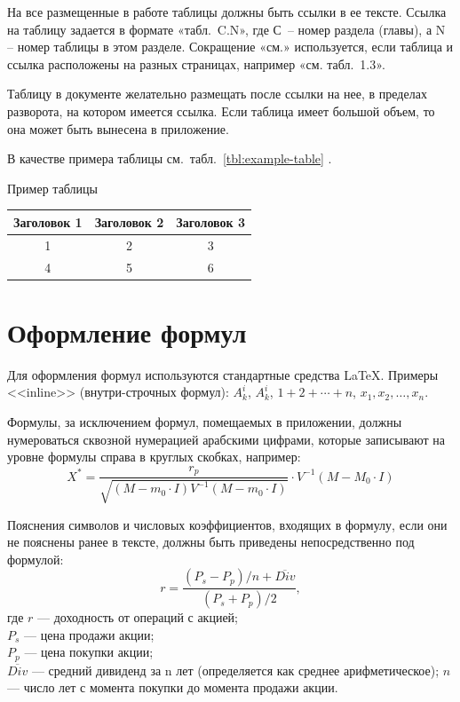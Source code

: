 \documentclass[PI,VKR]{HSEUniversityPractice}
\begin{document}
На все размещенные в работе таблицы должны быть ссылки в ее тексте. Ссылка на таблицу задается в формате «табл. C.N», где С – номер раздела (главы), а N – номер таблицы в этом разделе. Сокращение «см.» используется, если таблица и ссылка расположены на разных страницах, например «см. табл. 1.3».

Таблицу в документе желательно размещать после ссылки на нее, в пределах разворота, на котором имеется ссылка. Если таблица имеет большой объем, то она может быть вынесена в приложение.

В качестве примера таблицы см.~табл.~\ref{tbl:example-table} .

\begin{TABLE}[h]{Пример таблицы\label{tbl:example-table}}
	\begin{tabular}{c|cc}
		\hline\hline %
		Заголовок 1 & Заголовок 2 & Заголовок 3 \\ 
		\hline %
		1 & 2 & 3 \\
		4 & 5 & 6 \\
		\hline\hline %
	\end{tabular}
\end{TABLE}

\section{Оформление формул}

Для оформления формул используются стандартные средства \LaTeX{}. Примеры <<inline>> (внутри-строчных формул): $A^i_k$, $A_k^i$, $1+2+\cdots+n$, $x_1, x_2, \dots, x_n$.

Формулы, за исключением формул, помещаемых в приложении, должны нумероваться сквозной нумерацией арабскими цифрами, которые записывают на уровне формулы справа в круглых скобках, например:
\begin{equation}
	X^* = \frac{r_p}{\sqrt{(M-m_0\cdot I)V^{-1}(M-m_0\cdot I)}}\cdot V^{-1}(M-M_0\cdot I)
	\label{eq:formula-1}
\end{equation}

Пояснения символов и числовых коэффициентов, входящих в формулу, если они не пояснены ранее в тексте, должны быть приведены непосредственно под формулой:
\begin{equation}
	r = \frac{(P_s-P_p)/n + \overline{Div}}{(P_s + P_p)/2},
	\label{eq:formula-2}
\end{equation}
где $r$ --- доходность от операций с акцией;\\
$P_s$ --- цена продажи акции;\\
$P_p$ --- цена покупки акции;\\
$\overline{Div}$ --- средний дивиденд за n лет (определяется как среднее арифметическое); 
$n$ --- число лет с момента покупки до момента продажи акции.
\end{document}
